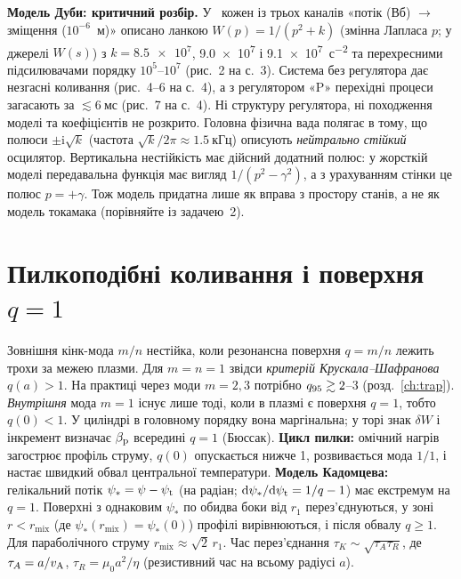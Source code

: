\textbf{Модель Дуби: критичний розбір.} У~\cite{Duba2018} кожен із трьох каналів «потік (Вб) $\to$ зміщення ($10^{-6}$~м)» описано ланкою $W(p)=1/(p^2+k)$ (змінна Лапласа $p$; у джерелі $W(s)$) з $k=\num{8.5e7}$, \num{9.0e7} і \SI{9.1e7}{с^{-2}} та перехресними підсилювачами порядку $10^5$--$10^7$ (рис.~2 на с.~3). Система без регулятора дає незгасні коливання (рис.~4--6 на с.~4), а з регулятором «P» перехідні процеси загасають за $\lesssim\SI{6}{мс}$ (рис.~7 на с.~4). Ні структуру регулятора, ні походження моделі та коефіцієнтів не розкрито. Головна фізична вада полягає в тому, що полюси $\pm\mathrm{i}\sqrt k$ (частота $\sqrt k/2\pi\approx\SI{1.5}{кГц}$) описують \emph{нейтрально стійкий} осцилятор. Вертикальна нестійкість має дійсний додатний полюс: у жорсткій моделі передавальна функція має вигляд $1/(p^2-\gamma^2)$, а з урахуванням стінки це полюс $p=+\gamma$. Тож модель придатна лише як вправа з простору станів, а не як модель токамака (порівняйте із задачею~2).

\section{Пилкоподібні коливання і поверхня \texorpdfstring{$q=1$}{q=1}}\label{sec:07-saw}

\begin{outofcorpus}
Зовнішня кінк-мода $m/n$ нестійка, коли резонансна поверхня $q=m/n$ лежить трохи за межею плазми. Для $m=n=1$ звідси \emph{критерій Крускала--Шафранова} $q(a)>1$. На практиці через моди $m=2,3$ потрібно $q_{95}\gtrsim2$--3 (розд.~\ref{ch:trap}). \emph{Внутрішня} мода $m=1$ існує лише тоді, коли в плазмі є поверхня $q=1$, тобто $q(0)<1$. У циліндрі в головному порядку вона маргінальна; у торі знак $\delta W$ і інкремент визначає $\beta_{\mathrm{p}}$ всередині $q=1$ (Бюссак). \textbf{Цикл пилки:} омічний нагрів загострює профіль струму, $q(0)$ опускається нижче 1, розвивається мода $1/1$, і настає швидкий обвал центральної температури. \textbf{Модель Кадомцева:} гелікальний потік $\psi_*=\psi-\psi_{\mathrm{t}}$ (на радіан; $\mathrm{d}\psi_*/\mathrm{d}\psi_{\mathrm{t}}=1/q-1$) має екстремум на $q=1$. Поверхні з однаковим $\psi_*$ по обидва боки від $r_1$ перез'єднуються, у зоні $r<r_{\mathrm{mix}}$ (де $\psi_*(r_{\mathrm{mix}})=\psi_*(0)$) профілі вирівнюються, і після обвалу $q\ge1$. Для параболічного струму $r_{\mathrm{mix}}\approx\sqrt2\,r_1$. Час перез'єднання $\tau_K\sim\sqrt{\tau_A\tau_R}$, де $\tau_A=a/v_{\mathrm{A}}$, $\tau_R=\mu_0a^2/\eta$ (резистивний час на всьому радіусі $a$).
\end{outofcorpus}

